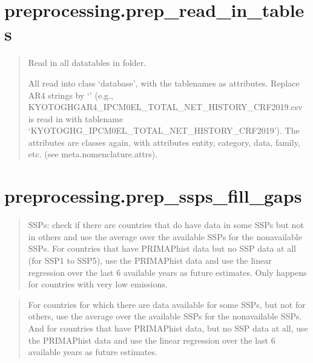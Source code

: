 \documentclass[letterpaper,10pt,english]{sphinxmanual}
\begin{document}
\chapter{preprocessing.prep\_read\_in\_tables}
\label{\detokenize{code:preprocessing-prep-read-in-tables}}
\begin{quote}

Read in all datatables in folder.

All read into class ‘database’, with the tablenames as attributes.
Replace AR4 strings by ‘’
(e.g., KYOTOGHGAR4\_IPCM0EL\_TOTAL\_NET\_HISTORY\_CRF2019.csv is read in
with tablename ‘KYOTOGHG\_IPCM0EL\_TOTAL\_NET\_HISTORY\_CRF2019’).
The attributes are classes again, with attributes entity, category,
data, family, etc. (see meta.nomenclature.attrs).
\end{quote}


\chapter{preprocessing.prep\_ssps\_fill\_gaps}
\label{\detokenize{code:preprocessing-prep-ssps-fill-gaps}}
\begin{quote}

SSPs: check if there are countries that do have data in some SSPs but not in others and
use the average over the available SSPs for the non\sphinxhyphen{}available SSPs.
For countries that have PRIMAP\sphinxhyphen{}hist data but no SSP data at all (for SSP1 to SSP5),
use the PRIMAP\sphinxhyphen{}hist data and use the linear regression over the last 6 available years
as future estimates.
Only happens for countries with very low emissions.
\end{quote}

\begin{quote}

For countries for which there are data available for some SSPs, but not for others,
use the average over the available SSPs for the non\sphinxhyphen{}available SSPs.
And for countries that have PRIMAP\sphinxhyphen{}hist data, but no SSP data at all, use the PRIMAP\sphinxhyphen{}hist
data and use the linear regression over the last 6 available years as future estimates.
\end{quote}
\end{document}
